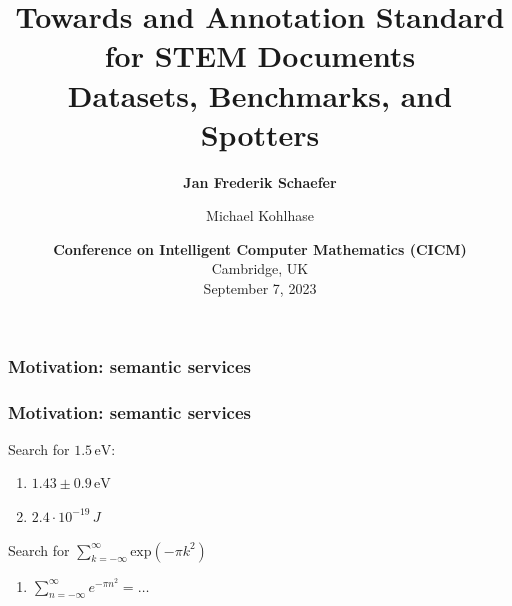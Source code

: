 \documentclass[aspectratio=169]{beamer}
\title{Towards and Annotation Standard for STEM Documents \\\large Datasets, Benchmarks, and Spotters}
\author{\textbf{Jan Frederik Schaefer} \and Michael Kohlhase}
\institute{FAU Erlangen-N\"urnberg/KWARC}
\date{\textbf{Conference on Intelligent Computer Mathematics (CICM)}\\Cambridge, UK\\September 7, 2023}
\begin{document}
\frame\titlepage


\begin{frame}
    \frametitle{Motivation: semantic services}
    \centering
\end{frame}

\begin{frame}
    \frametitle{Motivation: semantic services}
    Search for $1.5\,\text{eV}$:
    \begin{enumerate}
        \item $1.43 \pm 0.9\,\text{eV}$
        \item $2.4 \cdot 10^{-19}\,J$
    \end{enumerate}

    \vspace{2em}
    Search for $\sum_{k=-\infty}^\infty \text{exp}(-\pi k^2)$
    \begin{enumerate}
        \item $\sum_{n=-\infty}^\infty e^{-\pi n^2} = \ldots$
    \end{enumerate}
\end{frame}
\end{document}
